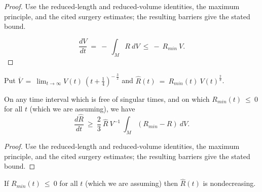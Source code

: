 \begin{proof}
\sketch Use the reduced-length and reduced-volume identities, the maximum principle, and the cited surgery estimates; the resulting barriers give the stated bound.

\begin{equation} \label{dVdt}
\frac{dV}{dt} \: = \: - \: \int_M R \: dV \: \le \: - \: R_{min} \: V.
\end{equation}
\end{proof}

\begin{definition}
  \label{def:kl-noncollapsed-pointed-limits-hyperbolic-noncollapsing-definition}
 \label{VR}
Put $\overline{V} \: = \: \lim_{t \rightarrow \infty} V(t) \: \left( t + \frac14 \right)^{- \: \frac32}$
and $\hat{R}(t) \: = \: R_{min}(t) \: V(t)^{\frac23}$.
\end{definition}

\begin{lemma}
  \label{lem:kl-noncollapsed-pointed-limits-hyperbolic-noncollapsing-lemma}
 \label{Rhatev}
On any time interval which is free of singular times,
and on which   $R_{min}(t) \: \le \: 0$ for all $t$
(which we are assuming), we have
\begin{equation} \label{Rhat}
\frac{d\hat{R}}{dt} \: \ge \: \frac23 \: \hat{R} \: V^{-1} \:
\int_M (R_{min} - R) \: dV.
\end{equation}
\end{lemma}

\begin{proof}
\sketch Use the reduced-length and reduced-volume identities, the maximum principle, and the cited surgery estimates; the resulting barriers give the stated bound.
\end{proof}

\begin{corollary}
  \label{cor:kl-noncollapsed-pointed-limits-hyperbolic-monotonicity-noncollapsing}
 \label{Rmono}
If $R_{min}(t) \: \le \: 0$ for all $t$
(which we are assuming) then $\hat{R}(t)$ is nondecreasing.
\end{corollary}

